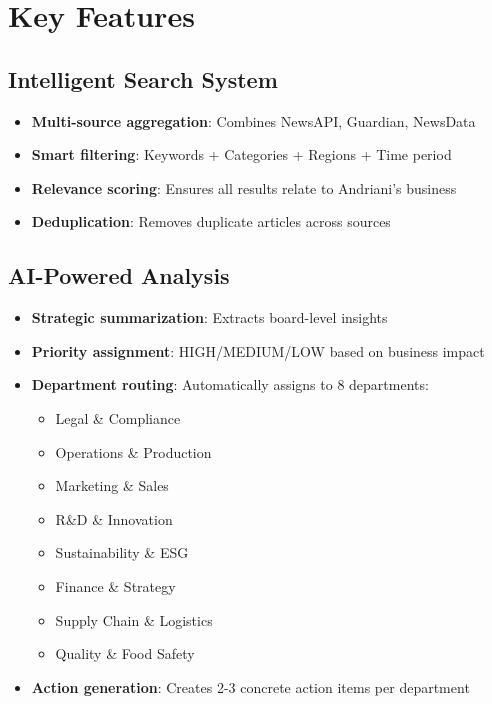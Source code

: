 \documentclass[11pt,a4paper]{article}
\begin{document}
\section{Key Features}

\subsection{Intelligent Search System}
\begin{itemize}[leftmargin=*]
    \item \textbf{Multi-source aggregation}: Combines NewsAPI, Guardian, NewsData
    \item \textbf{Smart filtering}: Keywords + Categories + Regions + Time period
    \item \textbf{Relevance scoring}: Ensures all results relate to Andriani's business
    \item \textbf{Deduplication}: Removes duplicate articles across sources
\end{itemize}

\subsection{AI-Powered Analysis}
\begin{itemize}[leftmargin=*]
    \item \textbf{Strategic summarization}: Extracts board-level insights
    \item \textbf{Priority assignment}: HIGH/MEDIUM/LOW based on business impact
    \item \textbf{Department routing}: Automatically assigns to 8 departments:
    \begin{itemize}
        \item Legal \& Compliance
        \item Operations \& Production
        \item Marketing \& Sales
        \item R\&D \& Innovation
        \item Sustainability \& ESG
        \item Finance \& Strategy
        \item Supply Chain \& Logistics
        \item Quality \& Food Safety
    \end{itemize}
    \item \textbf{Action generation}: Creates 2-3 concrete action items per department
\end{itemize}
\end{document}
